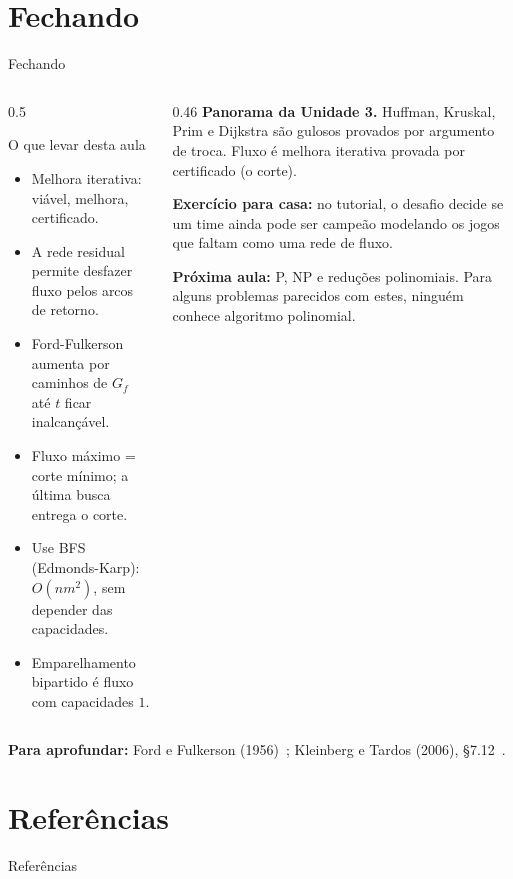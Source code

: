 \documentclass[aspectratio=169,xcolor=table]{beamer}
\newcommand{\fonte}[1]{%
  \vfill
  {\tiny\color{gray!55!black}\textbf{Para aprofundar:} #1\par}%
}
\begin{document}
\section*{Fechando}

\begin{frame}{Fechando}
  \begin{columns}[T]
    \begin{column}{0.5\textwidth}
      \begin{block}{O que levar desta aula}
        \scriptsize
        \begin{itemize}
          \item Melhora iterativa: viável, melhora, certificado.
          \item A rede residual permite desfazer fluxo pelos arcos de retorno.
          \item Ford-Fulkerson aumenta por caminhos de $G_f$ até $t$ ficar inalcançável.
          \item Fluxo máximo = corte mínimo; a última busca entrega o corte.
          \item Use BFS (Edmonds-Karp): $O(nm^2)$, sem depender das capacidades.
          \item Emparelhamento bipartido é fluxo com capacidades $1$.
        \end{itemize}
      \end{block}
    \end{column}
    \begin{column}{0.46\textwidth}
      \scriptsize
      \textbf{Panorama da Unidade 3.} Huffman, Kruskal, Prim e Dijkstra são gulosos provados
      por argumento de troca. Fluxo é melhora iterativa provada por certificado (o corte).
      \medskip

      \textbf{Exercício para casa:} no tutorial, o desafio decide se um time ainda pode ser
      campeão modelando os jogos que faltam como uma rede de fluxo.
      \medskip

      \textbf{Próxima aula:} P, NP e reduções polinomiais. Para alguns problemas parecidos
      com estes, ninguém conhece algoritmo polinomial.
    \end{column}
  \end{columns}
  \fonte{Ford e Fulkerson (1956)~\cite{ford1956maximal};
    Kleinberg e Tardos (2006), \S 7.12~\cite{kleinberg2006algorithm}.}
\end{frame}

\section*{Referências}
\begin{frame}[allowframebreaks]{Referências}
  \tiny
  \nocite{levitin2012introduction, cormen2009introduction, cormen2012algoritmos, kleinberg2006algorithm, dasgupta2008algorithms, sedgewick2011algorithms, ford1956maximal, edmonds1972theoretical, dinic1970algorithm, hopcroft1973n52, orlin2013max, chen2022maximum, schrijver2002history}
  
  
\end{frame}
\end{document}
